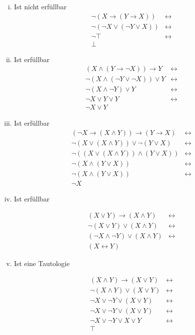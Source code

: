 \documentclass[11pt]{amsart}
\begin{document}
\begin{enumerate}[(i)]
\item Ist nicht erfüllbar
\begin{align*}
\lnot(X \to (Y \to X)) &\leftrightarrow \\
\lnot(\lnot X \lor (\lnot Y \lor X)) &\leftrightarrow \\
\lnot\top &\leftrightarrow \\
\bot
\end{align*}

\item Ist erfüllbar
\begin{align*}
(X \land (Y \to \lnot X)) \to Y &\leftrightarrow \\
\lnot(X \land (\lnot Y \lor \lnot X)) \lor Y &\leftrightarrow \\
\lnot(X \land \lnot Y) \lor Y &\leftrightarrow \\
\lnot X \lor Y \lor Y &\leftrightarrow \\
\lnot X \lor Y
\end{align*}

\item Ist erfüllbar
\begin{align*}
(\lnot X \to (X \land Y)) \to (Y \to X) &\leftrightarrow \\
\lnot (X \lor (X \land Y)) \lor \lnot(Y \lor X) &\leftrightarrow\\
\lnot ((X \lor (X \land Y)) \land (Y \lor X)) &\leftrightarrow\\
\lnot (X \land (Y \lor X)) &\leftrightarrow\\
\lnot (X \land (Y \lor X)) &\leftrightarrow\\
\lnot X
\end{align*}

\item Ist erfüllbar

\begin{align*}
(X \lor Y) \to (X \land Y) &\leftrightarrow\\
\lnot(X \lor Y) \lor (X \land Y) &\leftrightarrow\\
(\lnot X \land \lnot Y) \lor (X \land Y) &\leftrightarrow\\
(X \leftrightarrow Y)
\end{align*}

\item Ist eine Tautologie

\begin{align*}
(X \land Y ) \to (X \lor Y) &\leftrightarrow \\
\lnot (X \land Y ) \lor (X \lor Y) &\leftrightarrow\\
\lnot X \lor \lnot Y \lor (X \lor Y) &\leftrightarrow\\
\lnot X \lor \lnot Y \lor (X \lor Y) &\leftrightarrow\\
\lnot X \lor \lnot Y \lor X \lor Y &\leftrightarrow\\
\top
\end{align*}
\end{enumerate}
\end{document}
